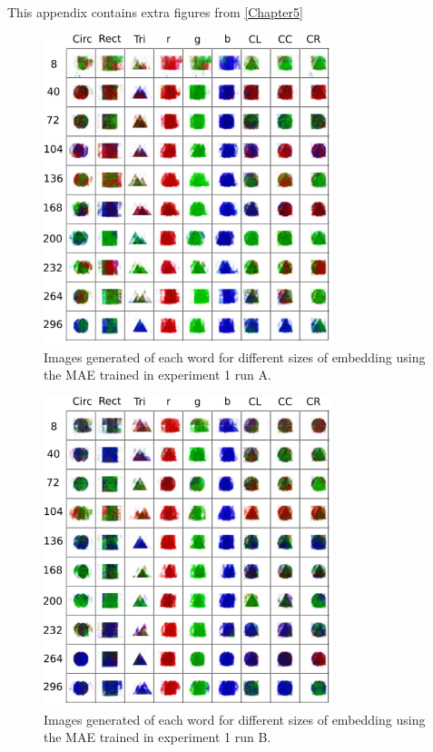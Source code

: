 \label{appendix:B}
This appendix contains extra figures from \autoref{Chapter5}
\begin{figure}
\centering
\includegraphics[width=0.75\textwidth]{Figs/shapes/singlelabel331A.png}
\caption{Images generated of each word for different sizes of embedding using the MAE trained in experiment 1 run A.}
\label{fig:331singleA}
\end{figure}
\begin{figure}
\centering
\includegraphics[width=0.75\textwidth]{Figs/shapes/singlelabel331B.png}
\caption{Images generated of each word for different sizes of embedding using the MAE trained in experiment 1 run B.}
\label{fig:331singleB}
\end{figure}
